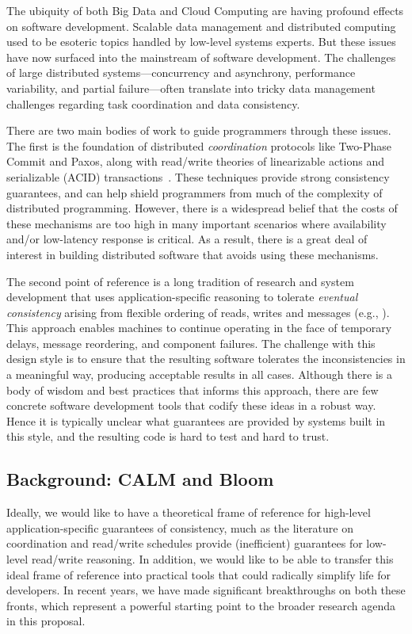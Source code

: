 The ubiquity of both Big Data and Cloud Computing are having profound effects on software development. Scalable data management and distributed computing used to be esoteric topics handled by low-level systems experts.  But these issues have now surfaced into the mainstream of software development.   The challenges of large distributed systems---concurrency and asynchrony, performance variability, and partial failure---often translate into tricky data management challenges regarding task coordination and data consistency.

There are two main bodies of work to guide programmers through these issues.  The first is the foundation of distributed \emph{coordination} protocols like Two-Phase Commit and Paxos, along with read/write theories of linearizable actions and serializable (ACID) transactions~\cite{distributedbook,grayreuter}. These techniques provide strong consistency guarantees, and can help shield programmers from much of the complexity of distributed programming. However, there is a widespread belief that the costs of these mechanisms are too high in many important scenarios where availability and/or low-latency response is critical.
As a result, there is a great deal of interest in building distributed software that avoids using these mechanisms.

The second point of reference is a long tradition of research and system development that uses application-specific reasoning to tolerate \emph{eventual consistency} arising from flexible ordering of reads, writes and messages (e.g., \cite{sagas,beyond,quicksand,base,bayou,Shapiro2011b}). This approach enables machines to continue operating in the face of temporary delays, message reordering, and component failures.  
The challenge with this design style is to ensure that the resulting software tolerates the inconsistencies in a meaningful way, producing acceptable results in all cases.  Although there is a body of wisdom and best practices that informs this approach, there are few concrete software development tools that codify these ideas in a robust way.  Hence it is typically unclear what guarantees are provided by systems built in this style, and the resulting code is hard to test and hard to trust.  

\subsection{Background: CALM and Bloom}
Ideally, we would like to have a theoretical frame of reference for high-level application-specific guarantees of consistency, much as the literature on coordination and read/write schedules provide (inefficient) guarantees for low-level read/write reasoning. In addition, we would like to be able to transfer this ideal frame of reference into practical tools that could radically simplify life for developers.  In recent years, we have made significant breakthroughs on both these fronts, which represent a powerful starting point to the broader research agenda in this proposal.

